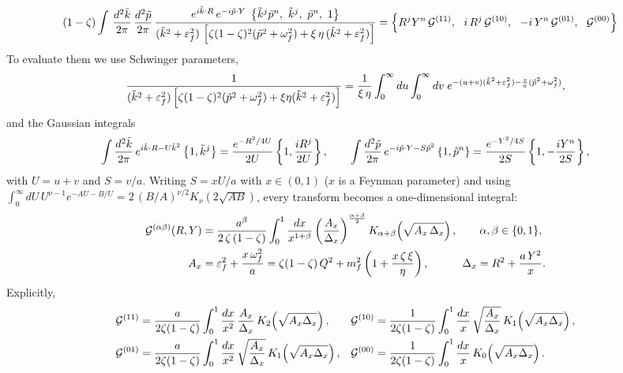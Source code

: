 \documentclass[9pt]{article}
\newcommand{\eps}{\varepsilon_{f}}           %
\newcommand{\om}{\omega_{f}}                 %
\newcommand{\G}[1]{\mathcal{G}^{(#1)}}       %
\numberwithin{equation}{section}
\begin{document}
\begin{enumerate}
\begin{align}\label{eq:FTdef}
    (1-\zeta)\int\, \frac{d^{2}\Tilde{k}}{2\pi}\, \frac{d^{2}\Tilde{p}}{2\pi}\, \frac{e^{i\Tilde{k}\cdot R}\,e^{-i\Tilde{p}\cdot Y}\;\left\{\Tilde{k}^{j}\Tilde{p}^{n},\ \Tilde{k}^{j},\ \Tilde{p}^{n},\ 1\right\}}{(\Tilde{k}^{2}+\eps^{2})\,\left[\zeta(1-\zeta)^{2}(\Tilde{p}^{2}+\om^{2})+\xi\,\eta\,(\Tilde{k}^{2}+\eps^{2})\right]} & = \left\{R^{j}Y^{n}\,\G{11},\ \ i\,R^{j}\,\G{10},\ \ -i\,Y^{n}\,\G{01},\ \ \G{00}\right\}
\end{align}
To evaluate them we use Schwinger parameters,
$$\frac{1}{(\Tilde{k}^{2}+\eps^{2})\left[\zeta(1-\zeta)^{2}(\Tilde{p}^{2}+\om^{2})+\xi\eta(\Tilde{k}^{2}+\eps^{2})\right]} = \frac{1}{\xi\,\eta}\int_{0}^{\infty}du\int_{0}^{\infty}dv\; e^{-(u+v)(\Tilde{k}^{2}+\eps^{2})-\frac{v}{a}(\Tilde{p}^{2}+\om^{2})},$$
and the Gaussian integrals
$$\int\frac{d^{2}\Tilde{k}}{2\pi}\,e^{i\Tilde{k}\cdot R-U\Tilde{k}^{2}}\left\{1,\Tilde{k}^{j}\right\} = \frac{e^{-R^{2}/4U}}{2U}\left\{1,\frac{iR^{j}}{2U}\right\},\hspace{2em} \int\frac{d^{2}\Tilde{p}}{2\pi}\,e^{-i\Tilde{p}\cdot Y-S\Tilde{p}^{2}}\left\{1,\Tilde{p}^{n}\right\} = \frac{e^{-Y^{2}/4S}}{2S}\left\{1,-\frac{iY^{n}}{2S}\right\},$$
with $U=u+v$ and $S=v/a$. Writing $S = xU/a$ with $x\in(0,1)$ ($x$ is a Feynman parameter) and using $\int_{0}^{\infty}dU\,U^{\nu-1}e^{-AU-B/U} = 2\,(B/A)^{\nu/2}K_{\nu}(2\sqrt{AB})$, every transform becomes a one-dimensional integral:
\begin{align}\label{eq:Gdef}
    \G{\alpha\beta}(R,Y) & = \frac{a^{\beta}}{2\,\zeta\,(1-\zeta)}\int_{0}^{1}\frac{dx}{x^{1+\beta}}\left(\frac{A_{x}}{\Delta_{x}}\right)^{\frac{\alpha+\beta}{2}}K_{\alpha+\beta}\!\left(\sqrt{A_{x}\,\Delta_{x}}\right),\hspace{2em} \alpha,\beta\in\{0,1\}, \notag \\
    A_{x} & = \eps^{2}+\frac{x\,\om^{2}}{a} = \zeta(1-\zeta)\,Q^{2}+m^{2}_{f}\left(1+\frac{x\,\zeta\,\xi}{\eta}\right),\hspace{3em} \Delta_{x} = R^{2}+\frac{a\,Y^{2}}{x}.
\end{align}
Explicitly,
\begin{align}
    \G{11} & = \frac{a}{2\zeta(1-\zeta)}\int_{0}^{1}\frac{dx}{x^{2}}\,\frac{A_{x}}{\Delta_{x}}\,K_{2}\!\left(\sqrt{A_{x}\Delta_{x}}\right), & \G{10} & = \frac{1}{2\zeta(1-\zeta)}\int_{0}^{1}\frac{dx}{x}\,\sqrt{\frac{A_{x}}{\Delta_{x}}}\,K_{1}\!\left(\sqrt{A_{x}\Delta_{x}}\right), \notag \\
    \G{01} & = \frac{a}{2\zeta(1-\zeta)}\int_{0}^{1}\frac{dx}{x^{2}}\,\sqrt{\frac{A_{x}}{\Delta_{x}}}\,K_{1}\!\left(\sqrt{A_{x}\Delta_{x}}\right), & \G{00} & = \frac{1}{2\zeta(1-\zeta)}\int_{0}^{1}\frac{dx}{x}\,K_{0}\!\left(\sqrt{A_{x}\Delta_{x}}\right).

\end{align}
\end{enumerate}
\end{document}
